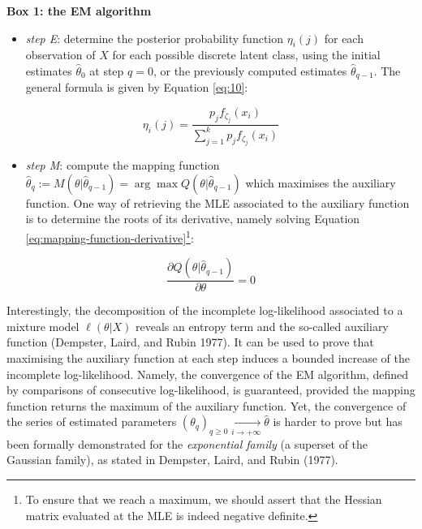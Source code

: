 \begin{blackbox}{\textbf{Box 1: the EM algorithm}}

\begin{center}

\begin{itemize}
\tightlist
\item
  \emph{step E}: determine the posterior probability function \(\eta_i(j)\)
  for each observation of \(X\) for each possible discrete latent class,
  using the initial estimates \(\hat{\theta}_0\) at step \(q=0\), or the
  previously computed estimates \(\hat{\theta}_{q-1}\). The general formula is given by Equation \eqref{eq:10}:
\end{itemize}

\begin{equation}
    \eta_i(j) = \frac{p_j f_{\zeta_j} (x_i)}{\sum_{j=1}^k p_j f_{\zeta_j} (x_i)}
\label{eq:10}
\end{equation}

\begin{itemize}
\tightlist
\item
  \emph{step M}: compute the mapping function
  \(\hat{\theta}_q:=M(\theta | \hat{\theta}_{q-1})=\arg \max Q(\theta| \hat{\theta}_{q-1})\) which maximises the auxiliary function. One way of retrieving the MLE associated to the auxiliary function is to determine the roots of its derivative, namely solving Equation \eqref{eq:mapping-function-derivative}\footnote{To ensure
    that we reach a maximum, we should assert that the Hessian matrix evaluated at the MLE is indeed negative definite.}:
\end{itemize}

\begin{equation}
    \frac{\partial Q(\theta| \hat{\theta}_{q-1})}{\partial \theta}=0
\label{eq:mapping-function-derivative}
\end{equation}

\end{center}

\end{blackbox}

Interestingly, the decomposition of the incomplete log-likelihood
associated to a mixture model \(\ell(\theta|X)\) reveals an entropy term
and the so-called auxiliary function (Dempster, Laird, and Rubin 1977). It can be used to prove that
maximising the auxiliary function at each step induces a bounded
increase of the incomplete log-likelihood. Namely, the convergence of
the EM algorithm, defined by comparisons of consecutive log-likelihood,
is guaranteed, provided the mapping function returns the maximum of the
auxiliary function. Yet, the convergence of the series of estimated
parameters
\((\theta_q)_{q \ge 0} \underset{i\to +\infty}{\longrightarrow} \hat{\theta}\)
is harder to prove but has been formally demonstrated for the \emph{exponential family} (a superset of the Gaussian family), as stated in Dempster, Laird, and Rubin (1977).

